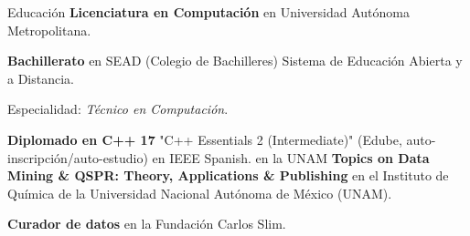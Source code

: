 
\begin{rubric}{Educación}
	\textbf{Licenciatura en Computación} en Universidad Autónoma Metropolitana.

	\entry*[2016 -- 2017]%
	\textbf{Bachillerato} en SEAD (Colegio de Bachilleres) Sistema de Educación Abierta y a Distancia.
	\par Especialidad: \emph{Técnico en Computación}.

	\entry*[] \textbf{Diplomado en C++ 17} "C++ Essentials 2 (Intermediate)" (Edube, auto-inscripción/auto-estudio) en IEEE Spanish. en la UNAM
	\entry*[] \textbf{Topics on Data Mining \& QSPR: Theory, Applications \& Publishing} en el Instituto de Química de la Universidad Nacional Autónoma de México (UNAM).

	\entry*[] \textbf{Curador de datos} en la Fundación Carlos Slim.


\end{rubric}

